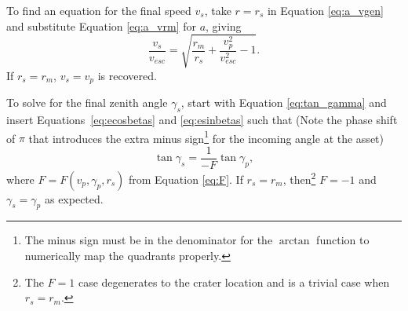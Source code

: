 \documentclass{article}
\begin{document}
To find an equation for the final speed $v_s$, take $r=r_s$ in Equation \eqref{eq:a_vgen} and substitute Equation \eqref{eq:a_vrm} for $a$, giving
\begin{equation}
\frac{v_s}{v_{esc}} = \sqrt{\frac{r_m}{r_s} + \frac{v_p^2}{v_{esc}^2} - 1}.
\end{equation}
If $r_s=r_m$, $v_s=v_p$ is recovered.
%

To solve for the final zenith angle $\gamma_s$, start with Equation \eqref{eq:tan_gamma} and insert Equations~\eqref{eq:ecosbetas} and \eqref{eq:esinbetas} such that (Note the phase shift of $\pi$ that introduces the extra minus sign\footnote{The minus sign must be in the denominator for the $\arctan$ function to numerically map the quadrants properly.} for the incoming angle at the asset)
\begin{equation}
\tan\gamma_s = \frac{1}{-F}\tan\gamma_p,
\end{equation}
where $F = F(v_p,\gamma_p,r_s)$ from Equation \eqref{eq:F}. If $r_s = r_m$, then\footnote{The $F=1$ case degenerates to the crater location and is a trivial case when $r_s=r_m$.} $F=-1$ and $\gamma_s = \gamma_p$ as expected.
\end{document}
